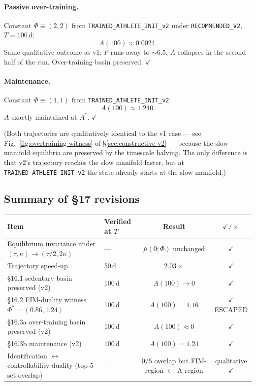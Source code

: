 \documentclass[11pt,a4paper]{article}
\theoremstyle{definition}
\begin{document}
\paragraph{Passive over-training.} Constant $\Phi \equiv (2, 2)$ from \texttt{TRAINED\_ATHLETE\_INIT\_v2} under \texttt{RECOMMENDED\_V2}, $T = 100$\,d:
\[
A(100) \approx 0.0024.
\]
Same qualitative outcome as v1: $F$ runs away to $\sim 6.5$, $A$ collapses in the second half of the run. Over-training basin preserved. $\checkmark$

\paragraph{Maintenance.} Constant $\Phi \equiv (1, 1)$ from \texttt{TRAINED\_ATHLETE\_INIT\_v2}:
\[
A(100) \approx 1.240.
\]
$A$ exactly maintained at $A^*$. $\checkmark$

(Both trajectories are qualitatively identical to the v1 case — see Fig.~\ref{fig:overtraining-witness} of §\ref{sec:constructive-v2} — because the slow-manifold equilibria are preserved by the timescale halving. The only difference is that v2's trajectory reaches the slow manifold faster, but at \texttt{TRAINED\_ATHLETE\_INIT\_v2} the state already starts at the slow manifold.)

\subsection{Summary of §17 revisions}

\begin{center}\small
\begin{tabular}{llcc}
\toprule
Item                                       & Verified at $T$ & Result    & $\checkmark/\times$ \\
\midrule
Equilibrium invariance under $(\tau, \kappa) \to (\tau/2, 2\kappa)$ & --- & $\bar\mu(0; \Phi)$ unchanged & $\checkmark$ \\
Trajectory speed-up                                                  & 50\,d & $2.03\times$            & $\checkmark$ \\
§16.1 sedentary basin preserved (v2)                                 & 100\,d & $A(100) \to 0$       & $\checkmark$ \\
§16.2 FIM-duality witness $\Phi^* = (0.86, 1.24)$                    & 100\,d & $A(100) = 1.16$      & $\checkmark$ ESCAPED \\
§16.3a over-training basin preserved (v2)                            & 100\,d & $A(100) \approx 0$   & $\checkmark$ \\
§16.3b maintenance (v2)                                              & 100\,d & $A(100) = 1.24$      & $\checkmark$ \\
Identification $\leftrightarrow$ controllability duality (top-5 set overlap)         & ---    & $0/5$ overlap but FIM-region $\subset$ A-region & qualitative $\checkmark$ \\
\bottomrule
\end{tabular}
\end{center}
\end{document}
